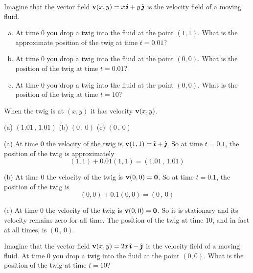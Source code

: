 \begin{question}
Imagine that the vector field $\mathbf{v}(x,y) = x\,\hat{\pmb{\imath}}+y\,\hat{\pmb{\jmath}}$ 
is the velocity field of a moving fluid.
\begin{enumerate}[(a)]
\item
At time $0$ you drop a twig into the fluid at
the point $(1,1)$. What is the approximate position of the twig
at time $t=0.01$?
\item
At time $0$ you drop a twig into the fluid at
the point $(0,0)$. What is the position of the twig
at time $t=0.01$? 
\item 
At time $0$ you drop a twig into the fluid at
the point $(0,0)$. What is the position of the twig
at time $t=10$?
\end{enumerate}
\end{question}

\begin{hint} 
When the twig is at $(x,y)$ it has velocity $\mathbf{v}(x,y)$.
\end{hint}

\begin{answer} 
(a) $(1.01\,,\,1.01)$\qquad
(b) $(0\,,\,0)$\qquad
(c) $(0\,,\,0)$
\end{answer}

\begin{solution}
(a) 
At time $0$ the velocity of the twig is
$\mathbf{v}(1,1) =\hat{\pmb{\imath}}+\hat{\pmb{\jmath}}$. So at time $t=0.1$, the position of the
twig is approximately
\begin{equation*}
(1,1) + 0.01(1,1) = (1.01\,,\,1.01)
\end{equation*}

(b) 
At time $0$ the velocity of the twig is
$\mathbf{v}(0,0) =\mathbf{0}$. So at time $t=0.1$, the position of the
twig is
\begin{equation*}
(0,0) + 0.1(0,0) = (0\,,\,0)
\end{equation*}

(c) At time $0$ the velocity of the twig is $\mathbf{v}(0,0) =\mathbf{0}$.
So it is stationary and its velocity remains zero for all time.
The position of the twig at time $10$, and in fact at all times,
is $(0\,,\,0)$.

\end{solution}

\begin{question}
Imagine that the vector field $\mathbf{v}(x,y) = 2x\,\hat{\pmb{\imath}} -\hat{\pmb{\jmath}}$ 
is the velocity field of a moving fluid.
At time $0$ you drop a twig into the fluid at
the point $(0,0)$. What is the position of the twig
at time $t=10$?
\end{question}

